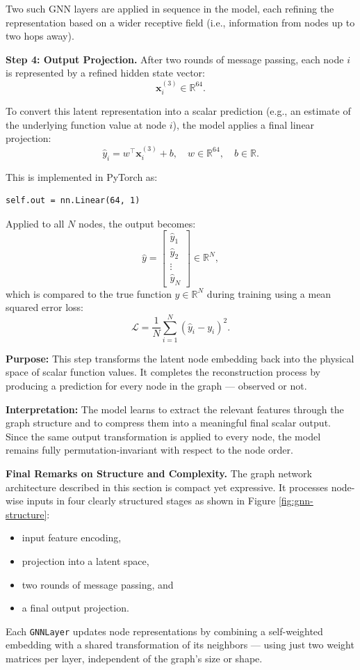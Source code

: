 Two such GNN layers are applied in sequence in the model, each refining the representation based on a wider receptive field (i.e., information from nodes up to two hops away).

%
{\bf Step 4: Output Projection.} After two rounds of message passing, each node $i$ is represented by a refined hidden state vector:
\[
\mathbf{x}_i^{(3)} \in \mathbb{R}^{64}.
\]

To convert this latent representation into a scalar prediction (e.g., an estimate of the underlying function value at node $i$), the model applies a final linear projection:
\[
\hat{y}_i = w^\top \mathbf{x}_i^{(3)} + b,
\quad w \in \mathbb{R}^{64}, \quad b \in \mathbb{R}.
\]

This is implemented in PyTorch as:
\begin{verbatim}
self.out = nn.Linear(64, 1)
\end{verbatim}

Applied to all $N$ nodes, the output becomes:
\[
\hat{y} =
\begin{bmatrix}
\hat{y}_1 \\
\hat{y}_2 \\
\vdots \\
\hat{y}_N
\end{bmatrix}
\in \mathbb{R}^{N},
\]
which is compared to the true function $y \in \mathbb{R}^{N}$ during training using a mean squared error loss:
\[
\mathcal{L} = \frac{1}{N} \sum_{i=1}^N (\hat{y}_i - y_i)^2.
\]

\medskip
{\bf Purpose:} This step transforms the latent node embedding back into the physical space of scalar function values. It completes the reconstruction process by producing a prediction for every node in the graph — observed or not.

\medskip
{\bf Interpretation:} The model learns to extract the relevant features through the graph structure and to compress them into a meaningful final scalar output. Since the same output transformation is applied to every node, the model remains fully permutation-invariant with respect to the node order.

\medskip
{\bf Final Remarks on Structure and Complexity.}
The graph network architecture described in this section is compact yet expressive. It processes node-wise inputs in four clearly structured stages as shown in Figure \ref{fig:gnn-structure}: 
\begin{itemize}
\item
input feature encoding, 
\item
projection into a latent space, 
\item
two rounds of message passing, and 
\item
a final output projection. 
\end{itemize}
Each {\tt GNNLayer} updates node representations by combining a self-weighted embedding with a shared transformation of its neighbors — using just two weight matrices per layer, independent of the graph's size or shape. 

